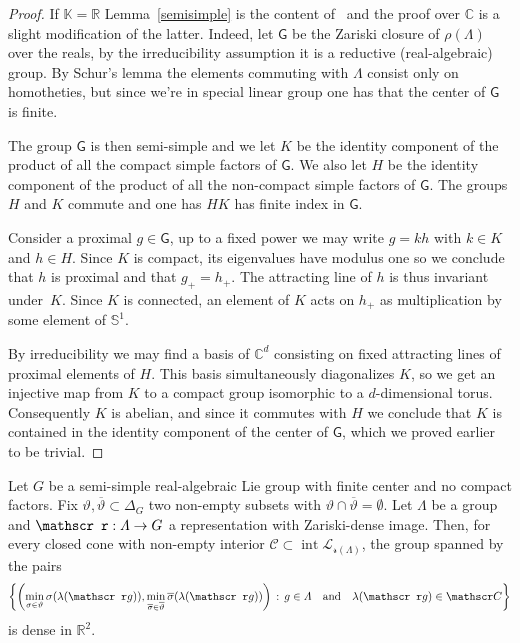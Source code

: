 \documentclass[AHL,Unicode,longabstracts,MathTools]{cedram}
\DeclareMathOperator{\inte}{int}
\newcommand{\scr}{\mathscr}
\renewcommand{\sf}[1]{{\mathsf{#1}}}
\newcommand{\sfG}{\sf{G}}
\newcommand{\calL}{\mathcal{L}}
\newcommand{\R}{\mathbb{R}}
\newcommand{\C}{\mathbb{C}}
\newcommand{\K}{\mathbb{K}}
\renewcommand{\circle}{\mathbb{S}^1}
\newcommand{\grupo}{\varLambda}
\newcommand{\simple}{{\sf \Delta}}
\newcommand{\ov}{\overline}
\renewcommand{\/}{\backslash}
\newcommand{\<}{\langle}
\renewcommand{\>}{\rangle}
\renewcommand*{\to}{\mathchoice{\longrightarrow}{\rightarrow}{\rightarrow}{\rightarrow}}
\let\originalleft\left
\let\originalright\right
\renewcommand{\left}{\mathopen{}\mathclose\bgroup\originalleft}
\renewcommand{\right}{\aftergroup\egroup\originalright}
\begin{document}
\begin{proof}
If $\K=\R$ Lemma~\ref{semisimple} is the content of~\cite[Lemma~8.6]{entropia} and the proof over $\C$ is a slight modification of the latter. Indeed, let $\sfG$ be the Zariski closure of $\rho(\grupo)$ over the reals, by the irreducibility assumption it is a reductive (real-algebraic) group. By Schur's lemma the elements commuting with $\grupo$ consist only on homotheties, but since we're in special linear group one has that the center of $\sfG$ is finite.


The group $\sfG$ is then semi-simple and we let $K$ be the identity component of the product of all the compact simple factors of $\sfG$. We also let $H$ be the identity component of the product of all the non-compact simple factors of $\sfG$. The groups $H$ and $K$ commute and one has $HK$ has finite index in $\sfG$.

Consider a proximal $g\in\sfG$, up to a fixed power we may write $g=kh$ with $k\in K$ and $h\in H$. Since $K$ is compact, its eigenvalues have modulus one so we conclude that $h$ is proximal and that $g_+=h_+$. The attracting line of $h$ is thus invariant under~$K$. Since $K$ is connected, an element of $ K$ acts on $h_+$ as multiplication by some element of $\circle$.

By irreducibility we may find a basis of $\C^d$ consisting on fixed attracting lines of proximal elements of $H$. This basis simultaneously diagonalizes $K$, so we get an injective map from $K$ to a compact group isomorphic to a $d$-dimensional torus. Consequently $K$ is abelian, and since it commutes with $H$ we conclude that $K$ is contained in the identity component of the center of $\sfG$, which we proved earlier to be trivial.
\end{proof}



\begin{lemm}\label{semi}
Let $G$ be a semi-simple real-algebraic Lie group with finite center and no compact factors. Fix $\vartheta,\ov\vartheta\subset\simple_G$ two non-empty subsets with $\vartheta\cap\ov\vartheta=\emptyset$. Let $\grupo$ be a group and $\scr r:\grupo\to G$ a representation with Zariski-dense image. Then, for every closed cone with non-empty interior $\scr C\subset\inte\calL_{\scr r(\grupo)}$, the group spanned by the pairs
\[
\left\{\left(\min_{\sigma\in\vartheta}\sigma(\lambda(\scr r g)),\min_{\ov\sigma\in\ov\vartheta}\ov\sigma(\lambda(\scr r g))\right)\,:\,g\in\grupo\quad\text{and}\quad\lambda(\scr rg)\in\scr C\right\}
\]
is dense in $\R^2$.
\end{lemm}
\end{document}
